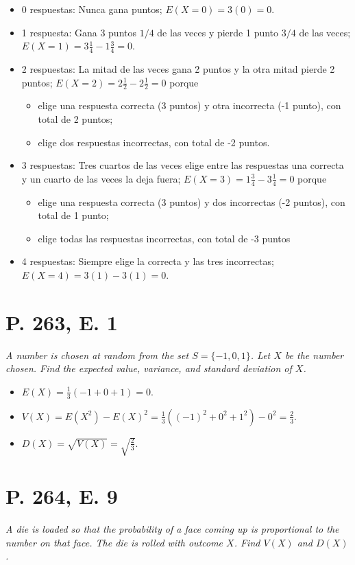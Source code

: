 \documentclass[paper=leter, fontsize=11pt]{scrartcl}
\numberwithin{equation}{section}		%
\numberwithin{figure}{section}			%
\numberwithin{table}{section}				%
\begin{document}
\begin{itemize}
    \item 0 respuestas: Nunca gana puntos; $E(X = 0) = 3 (0) = 0$.
    \item 1 respuesta:  Gana 3 puntos $1/4$ de las veces y pierde 1 punto $3/4$ de las veces; $E(X = 1) = 3 \frac{1}{4} - 1 \frac{3}{4} = 0$.
    \item 2 respuestas: La mitad de las veces gana 2 puntos y la otra mitad pierde 2 puntos; $E(X = 2) = 2 \frac{1}{2} -2 \frac{1}{2} = 0$ porque
    \begin{itemize}
        \item elige una respuesta correcta (3 puntos) y otra incorrecta (-1 punto), con total de 2 puntos;
        \item elige dos respuestas incorrectas, con total de -2 puntos.
    \end{itemize}
    \item 3 respuestas: Tres cuartos de las veces elige entre las respuestas una correcta y un cuarto de las veces la deja fuera; $E(X = 3) = 1 \frac{3}{4} -3 \frac{1}{4} = 0$ porque
    \begin{itemize}
        \item elige una respuesta correcta (3 puntos) y dos incorrectas (-2 puntos), con total de 1 punto;
        \item elige todas las respuestas incorrectas, con total de -3 puntos
    \end{itemize}
    \item 4 respuestas: Siempre elige la correcta y las tres incorrectas; $E(X = 4) = 3 (1) - 3 (1) = 0$.
\end{itemize}

\section*{P. 263, E. 1}
\emph{A number is chosen at random from the set \( S = \lbrace -1, 0, 1 \rbrace \). Let \(X\) be the number chosen. Find the expected value, variance, and standard deviation of \(X\).}
\begin{itemize}
    \item $E(X) = \frac{1}{3} (-1 + 0 + 1) = 0$.
    \item $V(X) = E(X^2) - E(X)^2 = \frac{1}{3}((-1)^2 + 0^2 + 1^2) - 0^2 = \frac{2}{3}$.
    \item $D(X) = \sqrt{V(X)} = \sqrt{\frac{2}{3}}$.
\end{itemize}

\section*{P. 264, E. 9}
\emph{A die is loaded so that the probability of a face coming up is proportional to the number on that face. The die is rolled with outcome $X$. Find $V(X)$ and $D(X)$.}
\end{document}
